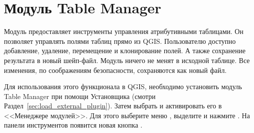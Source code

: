 
\section{Модуль Table Manager}\label{sec:ftools}


Модуль предоставляет инструменты управления атрибутивными таблицами. Он
позволяет управлять полями таблиц прямо из QGIS. Пользователю доступно
добавление, удаление, перемещение и клонирование полей. А также сохранение
результата в новый шейп-файл. Модуль ничего не менят в исходной таблице.
Все изменения, по соображениям безопасности, сохраняются как новый файл.


Для использования этого функционала в QGIS, необходимо установить модуль
Table Manager при помощи  Установщика
(смотри Раздел~\ref{sec:load_external_plugin}). Затем выбрать и
активировать его в <<Менеджере модулей>>. Для этого выберите меню
 \arrow {}, выделите
 и нажмите . На панели
инструментов появится новая кнопка .
